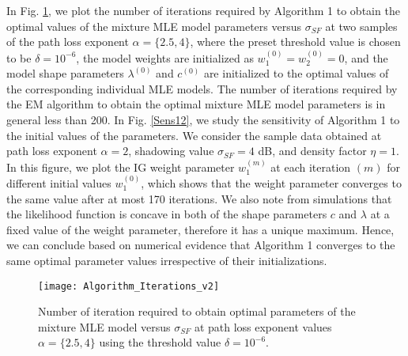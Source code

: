 \documentclass[12pt, draftclsnofoot, onecolumn]{IEEEtran}
\theoremstyle{plain}
\begin{document}
{In Fig. \ref{iterations}, we plot the number of iterations required by Algorithm 1 to obtain the optimal values of the mixture MLE model parameters versus $\sigma_{SF}$ at two samples of the path loss exponent $\alpha = \{ 2.5, 4\}$, where the preset threshold value is chosen to be $\delta = 10^{-6}$, the model weights are initialized as $w_1^{(0)}=w_2^{(0)}=0$, and the model shape parameters $\lambda^{(0)}$ and $c^{(0)}$ are initialized to the optimal values of the corresponding individual MLE models. The number of iterations required by the EM algorithm to obtain the optimal mixture MLE model parameters is in general less than 200. In Fig. \ref{Sens12}, we study the sensitivity of Algorithm 1 to the initial values of the parameters. We consider the sample data obtained at path loss exponent $\alpha=2$, shadowing value $\sigma_{SF}=4$ dB, and density factor $\eta = 1$. %
{\color{black}In this figure,} we plot the IG weight parameter $w_1^{(m)}$ at each iteration $(m)$ for different initial values $w_1^{(0)}$, which shows that the weight parameter converges to the same value after at most 170 iterations. We also note from simulations %
that the likelihood function is concave in both of the shape parameters $c$ and $\lambda$ at a fixed value of the weight parameter, therefore it has a unique maximum. Hence, we can conclude based on numerical evidence that Algorithm 1 converges to the same optimal parameter values irrespective of their initializations.}
\iffalse
\begin{figure}[t]%
        \centering
        \texttt{[image: Algorithm\_Iterations\_v2]}
        \vspace{-0.25in}
        \caption{Number of iteration required to obtain optimal parameters of the mixture MLE model versus $\sigma_{SF}$ at path loss exponent values $\alpha = \{2.5, 4\}$ using the threshold value $\delta = 10^{-6}$.} 
        \label{iterations}
        \vspace{-.45in}
\end{figure}%
\end{document}
